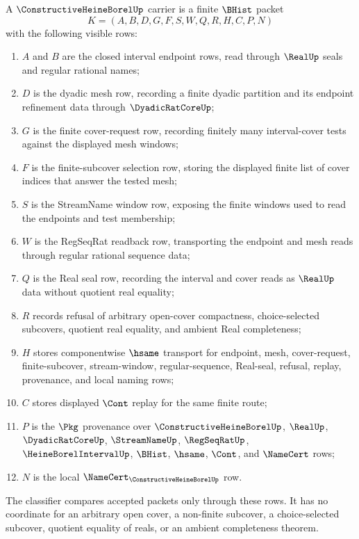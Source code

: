 \begin{definition}
\label{def:constructive-heine-borel-carrier}
A $\ConstructiveHeineBorelUp$ carrier is a finite $\BHist$ packet
$$
K=(A,B,D,G,F,S,W,Q,R,H,C,P,N)
$$
with the following visible rows:
\begin{enumerate}
\item $A$ and $B$ are the closed interval endpoint rows, read through $\RealUp$ seals and regular rational names;
\item $D$ is the dyadic mesh row, recording a finite dyadic partition and its endpoint refinement data through $\DyadicRatCoreUp$;
\item $G$ is the finite cover-request row, recording finitely many interval-cover tests against the displayed mesh windows;
\item $F$ is the finite-subcover selection row, storing the displayed finite list of cover indices that answer the tested mesh;
\item $S$ is the StreamName window row, exposing the finite windows used to read the endpoints and test membership;
\item $W$ is the RegSeqRat readback row, transporting the endpoint and mesh reads through regular rational sequence data;
\item $Q$ is the Real seal row, recording the interval and cover reads as $\RealUp$ data without quotient real equality;
\item $R$ records refusal of arbitrary open-cover compactness, choice-selected subcovers, quotient real equality, and ambient Real completeness;
\item $H$ stores componentwise $\hsame$ transport for endpoint, mesh, cover-request, finite-subcover, stream-window, regular-sequence, Real-seal, refusal, replay, provenance, and local naming rows;
\item $C$ stores displayed $\Cont$ replay for the same finite route;
\item $P$ is the $\Pkg$ provenance over $\ConstructiveHeineBorelUp$, $\RealUp$, $\DyadicRatCoreUp$, $\StreamNameUp$, $\RegSeqRatUp$, $\HeineBorelIntervalUp$, $\BHist$, $\hsame$, $\Cont$, and $\NameCert$ rows;
\item $N$ is the local $\NameCert_{\ConstructiveHeineBorelUp}$ row.
\end{enumerate}
The classifier compares accepted packets only through these rows. It has no coordinate for an arbitrary open cover, a non-finite subcover, a choice-selected subcover, quotient equality of reals, or an ambient completeness theorem.
\end{definition}

